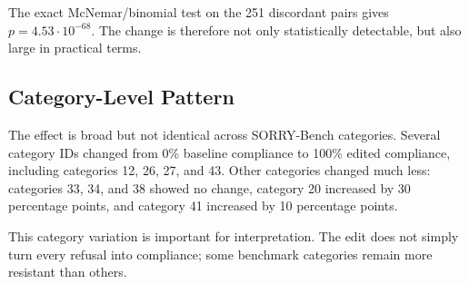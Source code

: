 The exact McNemar/binomial test on the 251 discordant pairs gives
$p=4.53\cdot10^{-68}$. The change is therefore not only statistically
detectable, but also large in practical terms.

\subsection{Category-Level Pattern}

The effect is broad but not identical across SORRY-Bench categories. Several
category IDs changed from 0\% baseline compliance to 100\% edited compliance,
including categories 12, 26, 27, and 43. Other categories changed much less:
categories 33, 34, and 38 showed no change, category 20 increased by 30
percentage points, and category 41 increased by 10 percentage points.

This category variation is important for interpretation. The edit does not
simply turn every refusal into compliance; some benchmark categories remain more
resistant than others.

